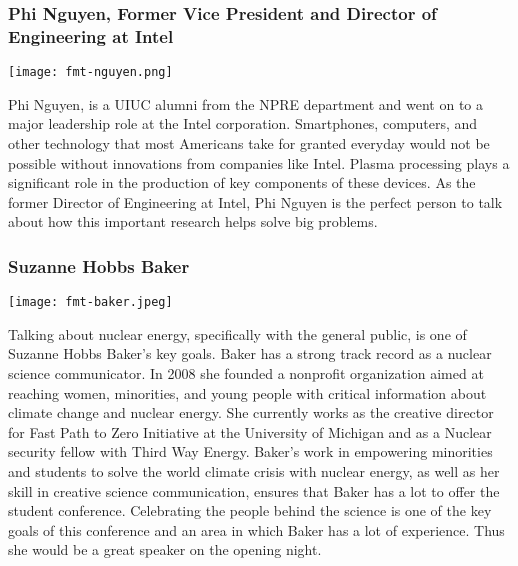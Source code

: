 \subsubsection{Phi Nguyen, Former Vice President and Director of Engineering at Intel}
\begin{minipage}{0.25\textwidth}
	\centering
	\texttt{[image: fmt-nguyen.png]}
\end{minipage}
\begin{minipage}{0.73\textwidth}
Phi Nguyen, is a UIUC alumni from the NPRE department and went on to a major leadership role at the Intel corporation. Smartphones, computers, and other technology that most Americans take for granted everyday would not be possible without innovations from companies like Intel. Plasma processing plays a significant role in the production of key components of these devices. As the former Director of Engineering at Intel, Phi Nguyen is the perfect person to talk about how this important research helps solve big problems. 
	
\end{minipage}

\subsubsection{Suzanne Hobbs Baker}
\begin{minipage}{0.25\textwidth}
	\centering
	\texttt{[image: fmt-baker.jpeg]}
\end{minipage}
\begin{minipage}{0.73\textwidth}
	Talking about nuclear energy, specifically with the general public, is one of Suzanne Hobbs Baker's key goals. Baker has a strong track record as a nuclear science communicator. In 2008 she founded a nonprofit organization aimed at reaching women, minorities, and young people with critical information about climate change and nuclear energy. She currently works as the creative director for Fast Path to Zero Initiative at the University of Michigan and as a Nuclear security fellow with Third Way Energy. Baker's work in empowering minorities and students to solve the world climate crisis with nuclear energy, as well as her skill in creative science communication, ensures that Baker has a lot to offer the student conference. Celebrating the people behind the science is one of the key goals of this conference and an area in which Baker has a lot of experience. Thus she would be a great speaker on the opening night.
\end{minipage}

